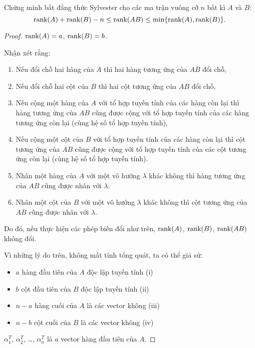 \documentclass[class=linear-algebra,crop=false]{standalone}
\begin{document}
\begin{exercise}
	\par Chứng minh bất đẳng thức Sylvester cho các ma trận vuông cỡ $n$ bất kì $A$ và $B$:
	\[
		\text{rank}(A) + \text{rank}(B) - n \le \text{rank}(AB) \le \min\{ \text{rank}(A), \text{rank}(B) \}.
	\]
\end{exercise}

\begin{proof}
	\par $\text{rank}(A) = a$, $\text{rank}(B) = b$.
	\par Nhận xét rằng:
	\begin{enumerate}[label = (\roman*)]
		\item Nếu đổi chỗ hai hàng của $A$ thì hai hàng tương ứng của $AB$ đổi chỗ,
		\item Nếu đổi chỗ hai cột của $B$ thì hai cột tương ứng của $AB$ đổi chỗ,
		\item Nếu cộng một hàng của $A$ với tổ hợp tuyến tính của các hàng còn lại thì hàng tương ứng của $AB$ cũng được cộng với tổ hợp tuyến tính của các hàng tương ứng còn lại (cùng hệ số tổ hợp tuyến tính),
		\item Nếu cộng một cột của $B$ với tổ hợp tuyến tính của các hàng còn lại thì cột tương ứng của $AB$ cũng được cộng với tổ hợp tuyến tính của các cột tương ứng còn lại (cùng hệ số tổ hợp tuyến tính).
		\item Nhân một hàng của $A$ với một vô hướng $\lambda$ khác không thì hàng tương ứng của $AB$ cũng được nhân với $\lambda$.
		\item Nhân một cột của $B$ với một vô hướng $\lambda$ khác không thì cột tương ứng của $AB$ cũng được nhân với $\lambda$.
	\end{enumerate}
	\par Do đó, nếu thực hiện các phép biến đổi như trên, $\text{rank}(A)$, $\text{rank}(B)$, $\text{rank}(AB)$ không đổi.
	\bigskip
	\par Vì những lý do trên, không mất tính tổng quát, ta có thể giả sử:
	\begin{itemize}
		\item $a$ hàng đầu tiên của $A$ độc lập tuyến tính (i)
		\item $b$ cột đầu tiên của $B$ độc lập tuyến tính (ii)
		\item $n - a$ hàng cuối của $A$ là các vector không (iii)
		\item $n - b$ cột cuối của $B$ là các vector không (iv)
	\end{itemize}
	\par $\alpha_{1}^{T}$, $\alpha_{2}^{T}$, \ldots, $\alpha_{a}^{T}$ là $a$ vector hàng đầu tiên của $A$.

\end{proof}
\end{document}
